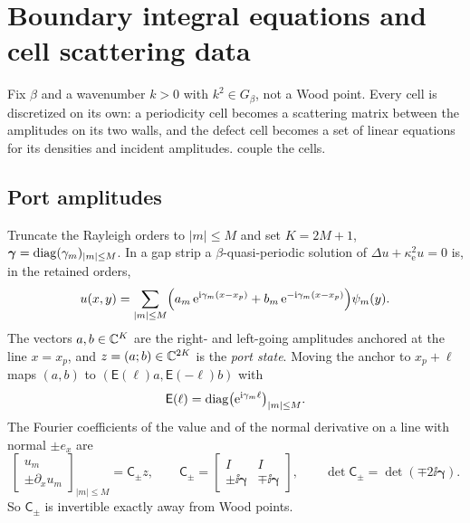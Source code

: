 \section{Boundary integral equations and cell scattering data}\label{sec:discretization}

Fix $\beta$ and a wavenumber $k>0$ with $k^2\in G_\beta$, not a Wood point.
Every cell is discretized on its own: a periodicity cell becomes a scattering
matrix between the amplitudes on its two walls, and the defect cell becomes a set of
linear equations for its densities and incident amplitudes.
 couple the cells.

\subsection{Port amplitudes}\label{sec:ports}
Truncate the Rayleigh orders to $|m|\le M$ and set $K=2M+1$,
$\boldsymbol\gamma=\operatorname{diag}(\gamma_m)_{|m|\le M}$. In a gap strip a
$\beta$-quasi-periodic solution of $\Delta u+\kappa_{\mathrm e}^2u=0$ is, in the
retained orders,
\begin{equation}\label{eq:rayleigh}
  u(x,y)=\sum_{|m|\le M}\Bigl(a_m\,\mathrm{e}^{\mathrm{i}\gamma_m(x-x_p)}
         +b_m\,\mathrm{e}^{-\mathrm{i}\gamma_m(x-x_p)}\Bigr)\psi_m(y).
\end{equation}
The vectors $a,b\in\mathbb{C}^K$ are the right- and left-going amplitudes anchored at
the line $x=x_p$, and $z=(a;b)\in\mathbb{C}^{2K}$ is the \emph{port state}. Moving
the anchor to $x_p+\ell$ maps $(a,b)$ to $(\mathsf E(\ell)a,\mathsf E(-\ell)b)$
with
\begin{equation}\label{eq:phase}
  \mathsf E(\ell)=\operatorname{diag}\bigl(\mathrm{e}^{\mathrm{i}\gamma_m\ell}\bigr)_{|m|\le M}.
\end{equation}
The Fourier coefficients of the value and of the normal derivative on a line
with normal $\pm e_x$ are
\begin{equation}\label{eq:cauchy}
  \begin{bmatrix}u_m\\ \pm\partial_xu_m\end{bmatrix}_{|m|\le M}
  =\mathsf C_\pm z,\qquad
  \mathsf C_\pm=\begin{bmatrix}I&I\\ \pm\ii\boldsymbol\gamma&\mp\ii\boldsymbol\gamma\end{bmatrix},
  \qquad
  \det\mathsf C_\pm=\det(\mp2\ii\boldsymbol\gamma).
\end{equation}
So $\mathsf C_\pm$ is invertible exactly away from Wood points.

